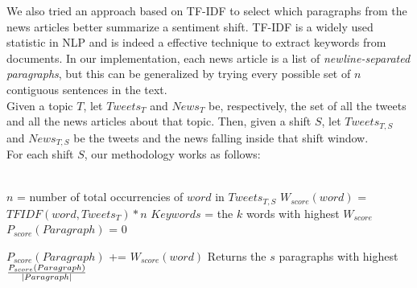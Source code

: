 We also tried an approach based on TF-IDF to select which paragraphs from the news articles better summarize a sentiment shift. TF-IDF is a widely used statistic in NLP and is indeed a effective technique to extract keywords from documents. In our implementation, each news article is a list of \emph{newline-separated paragraphs}, but this can be generalized by trying every possible set of $n$ contiguous sentences in the text.
\\
Given a topic $T$, let $Tweets_T$ and $News_T$ be, respectively, the set of all the tweets and all the news articles about that topic. Then, given a shift $S$, let $Tweets_{T,S}$ and $News_{T,S}$ be the tweets and the news falling inside that shift window.
\\
For each shift $S$, our methodology works as follows:
\\\\
\begin{algorithmic}

	\STATE $n$ = number of total occurrencies of $word$ in $Tweets_{T,S}$
	\STATE $W_{score}(word)$ = $TFIDF(word,Tweets_T) * n$
\ENDFOR
\STATE
\STATE $Keywords$ = the $k$ words with highest $W_{score}$
\STATE
{}
		\STATE $P_{score}(Paragraph)$ = $0$

				\STATE $P_{score}(Paragraph)$ += $W_{score}(word)$
			\ENDIF
		\ENDFOR
	\ENDFOR
\ENDFOR
\STATE
\STATE Returns the $s$ paragraphs with highest $ {P_{score}(Paragraph) \over |Paragraph| } $


\end{algorithmic}





